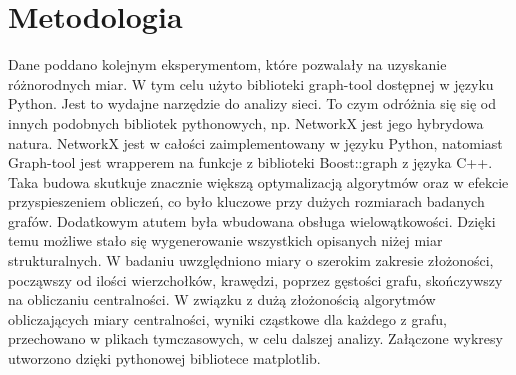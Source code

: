 \section{Metodologia}
Dane poddano kolejnym eksperymentom, które pozwalały na uzyskanie różnorodnych miar. W tym celu użyto biblioteki graph-tool dostępnej w języku Python. Jest to wydajne narzędzie do analizy sieci. To czym odróżnia się się od innych podobnych bibliotek pythonowych, np. NetworkX jest jego hybrydowa natura. NetworkX jest w całości zaimplementowany w języku Python, natomiast Graph-tool jest wrapperem na funkcje z biblioteki Boost::graph z języka C++. Taka budowa skutkuje znacznie większą optymalizacją algorytmów oraz w efekcie przyspieszeniem obliczeń, co było kluczowe przy dużych rozmiarach badanych grafów. Dodatkowym atutem była wbudowana obsługa wielowątkowości. Dzięki temu możliwe stało się wygenerowanie wszystkich opisanych niżej miar strukturalnych. W badaniu uwzględniono miary o szerokim zakresie złożoności, począwszy od ilości wierzchołków, krawędzi, poprzez gęstości grafu, skończywszy na obliczaniu centralności. W związku z dużą złożonością algorytmów obliczających miary centralności, wyniki cząstkowe dla każdego z grafu, przechowano w plikach tymczasowych, w celu dalszej analizy. Załączone wykresy utworzono dzięki pythonowej bibliotece matplotlib.

